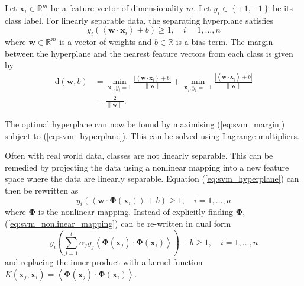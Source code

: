 Let $\mathbf{x}_i \in \mathbb{R}^m$ be a feature vector of dimensionality $m$.
Let $y_i \in \left\{ +1, -1 \right\}$ be its class label. For linearly separable
data, the separating hyperplane satisfies
\begin{equation}\label{eq:svm_hyperplane}
y_i\left( \left< \mathbf{w} \cdot \mathbf{x}_i \right> + b \right) \ge 1, \hspace{1em}
i = 1,\ldots,n
\end{equation}
where $\mathbf{w} \in \mathbb{R}^m$ is a vector of weights and $b \in
\mathbb{R}$ is a bias term. The margin between the hyperplane and the nearest
feature vectors from each class is given by
\begin{align}
  \text{d}(\mathbf{w},b) &=
  \min_{\mathbf{x}_i,y_i=1}
  \frac{|\left< \mathbf{w} \cdot \mathbf{x}_i \right> + b|}{\|\mathbf{w}\|} +
  \min_{\mathbf{x}_j,y_i=-1}
  \frac{|\left< \mathbf{w} \cdot \mathbf{x}_j \right> + b|}{\|\mathbf{w}\|} \\[0.5em]
                         &= \frac{2}{\|\mathbf{w}\|}. \label{eq:svm_margin}
\end{align}

The optimal hyperplane can now be found by maximising (\ref{eq:svm_margin})
subject to (\ref{eq:svm_hyperplane}). This can be solved using Lagrange
multipliers.

Often with real world data, classes are not linearly separable. This can
be remedied by projecting the data using a nonlinear mapping into a new feature
space where the data are linearly separable. Equation (\ref{eq:svm_hyperplane})
can then be rewritten as
\begin{equation}\label{eq:svm_nonlinear_mapping}
y_i\left( \left< \mathbf{w} \cdot \boldsymbol{\Phi}(\mathbf{x}_i) \right> + b \right) \ge 1, \hspace{1em}
i = 1,\ldots,n
\end{equation}
where $\boldsymbol{\Phi}$ is the nonlinear mapping. Instead of explicitly
finding $\boldsymbol{\Phi}$, (\ref{eq:svm_nonlinear_mapping}) can be re-written
in dual form
\begin{equation}
y_i\left(
  \sum_{j=1}^{l} \alpha_j y_j \left<
  \boldsymbol{\Phi}(\mathbf{x}_j) \cdot \boldsymbol{\Phi}(\mathbf{x}_i)
  \right>
\right) + b \ge 1, \hspace{1em} i=1,\ldots,n
\end{equation}
and replacing the inner product with a kernel function
$K(\mathbf{x}_j,\mathbf{x}_i) = \left< \boldsymbol{\Phi}(\mathbf{x}_j) \cdot
\boldsymbol{\Phi}(\mathbf{x}_i) \right>$.

